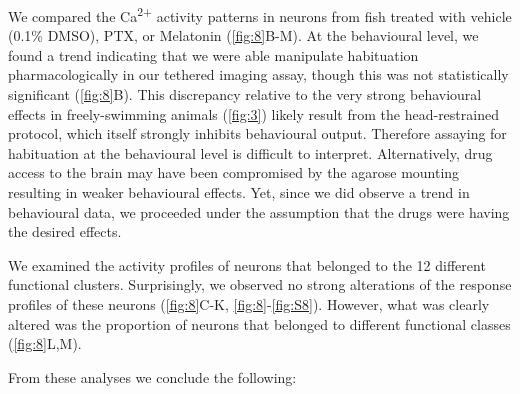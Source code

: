 \documentclass[9pt,lineno]{RandlettLab_elife}
\begin{document}
We compared the Ca\textsuperscript{2+} activity patterns in neurons from fish treated with vehicle (0.1\% DMSO), PTX, or Melatonin (\autoref{fig:8}B-M). At the behavioural level, we found a trend indicating that we were able manipulate habituation pharmacologically in our tethered imaging assay, though this was not statistically significant (\autoref{fig:8}B). This discrepancy relative to the very strong behavioural effects in freely-swimming animals (\autoref{fig:3}) likely result from the head-restrained protocol, which itself strongly inhibits behavioural output. Therefore assaying for habituation at the behavioural level is difficult to interpret. Alternatively, drug access to the brain may have been compromised by the agarose mounting resulting in weaker behavioural effects. Yet, since we did observe a trend in behavioural data, we proceeded under the assumption that the drugs were having the desired effects. 

We examined the activity profiles of neurons that belonged to the 12 different functional clusters. Surprisingly, we observed no strong alterations of the response profiles of these neurons (\autoref{fig:8}C-K, \autoref{fig:8}-\autoref{fig:S8}). However, what was clearly altered was the proportion of neurons that belonged to different functional classes (\autoref{fig:8}L,M).

From these analyses we conclude the following:
\end{document}
